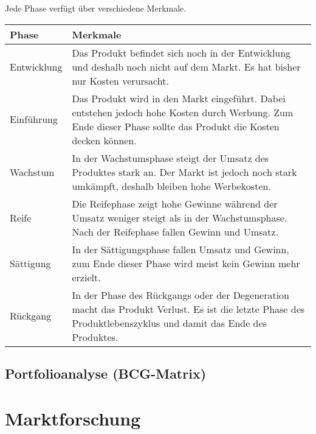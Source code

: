 \begin{center}
\end{center}
\pagebreak

\begin{flushleft}
    Jede Phase verfügt über verschiedene Merkmale.
\end{flushleft}
\begin{center}
\begin{tabular}{|l|p{8cm}|}
    \hline
    \textbf{Phase} & \textbf{Merkmale} \\
    \hline
    Entwicklung & Das Produkt befindet sich noch in der Entwicklung und deshalb noch nicht auf dem Markt. Es hat bisher nur Kosten verursacht. \\
    \hline
    Einführung & Das Produkt wird in den Markt eingeführt. Dabei entstehen jedoch hohe Kosten durch Werbung. Zum Ende dieser Phase sollte das Produkt die Kosten decken können. \\
    \hline
    Wachstum & In der Wachstumsphase steigt der Umsatz des Produktes stark an. Der Markt ist jedoch noch stark umkämpft, deshalb bleiben hohe Werbekosten. \\
    \hline
    Reife & Die Reifephase zeigt hohe Gewinne während der Umsatz weniger steigt als in der Wachstumsphase. Nach der Reifephase fallen Gewinn und Umsatz. \\
    \hline
    Sättigung & In der Sättigungsphase fallen Umsatz und Gewinn, zum Ende dieser Phase wird meist kein Gewinn mehr erzielt. \\
    \hline
    Rückgang & In der Phase des Rückgangs oder der Degeneration macht das Produkt Verlust. Es ist die letzte Phase des Produktlebenszyklus und damit das Ende des Produktes. \\
    \hline
\end{tabular}
\end{center}

\subsection{Portfolioanalyse (BCG-Matrix)}

\section{Marktforschung}